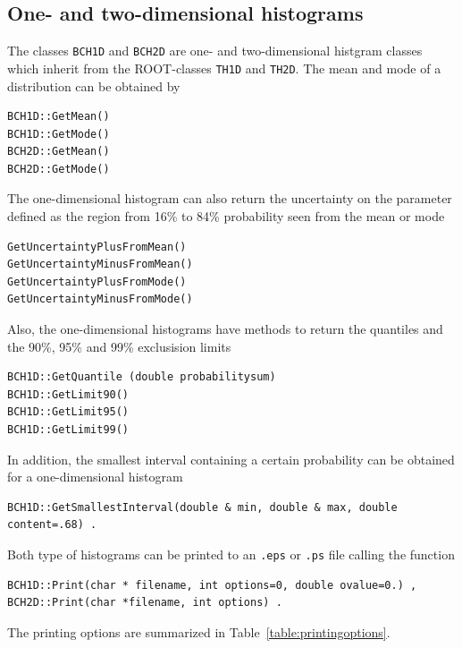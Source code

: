 \documentclass[11pt, a4paper]{article}
\begin{document}

\subsection{One- and two-dimensional histograms} 

The classes \verb|BCH1D| and \verb|BCH2D| are one- and two-dimensional
histgram classes which inherit from the ROOT-classes \verb|TH1D| and
\verb|TH2D|. The mean and mode of a distribution can be obtained by 
%
\begin{verbatim}
BCH1D::GetMean()
BCH1D::GetMode()
BCH2D::GetMean()
BCH2D::GetMode()
\end{verbatim} 

\noindent 
The one-dimensional histogram can also return the uncertainty on the
parameter defined as the region from 16\% to 84\% probability seen
from the mean or mode
%
\begin{verbatim}
GetUncertaintyPlusFromMean()
GetUncertaintyMinusFromMean()
GetUncertaintyPlusFromMode()
GetUncertaintyMinusFromMode()
\end{verbatim} 

\noindent 
Also, the one-dimensional histograms have methods to return the
quantiles and the 90\%, 95\% and 99\% exclusision limits
%
\begin{verbatim} 
BCH1D::GetQuantile (double probabilitysum)
BCH1D::GetLimit90()
BCH1D::GetLimit95()
BCH1D::GetLimit99()
\end{verbatim} 

\noindent 
In addition, the smallest interval containing a certain probability
can be obtained for a one-dimensional histogram 
%
\begin{verbatim}
BCH1D::GetSmallestInterval(double & min, double & max, double content=.68) . 
\end{verbatim}

\noindent 
Both type of histograms can be printed to an \verb|.eps| or \verb|.ps|
file calling the function 

\begin{verbatim}
BCH1D::Print(char * filename, int options=0, double ovalue=0.) , 
BCH2D::Print(char *filename, int options) . 
\end{verbatim}  

The printing options are summarized in Table~\ref{table:printingoptions}. 
\end{document}
